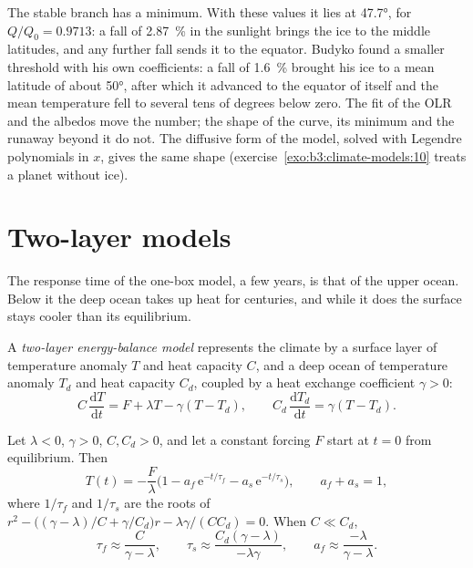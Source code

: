 
The stable branch has a minimum. With these values it lies at \ang{47.7},
for $Q/Q_0 = \num{0.9713}$: a fall of \qty{2.87}{\percent} in the sunlight
brings the ice to the middle latitudes, and any further fall sends it to
the equator. Budyko found a smaller threshold with his own coefficients: a
fall of \qty{1.6}{\percent} brought his ice to a mean latitude of about
\ang{50}, after which it advanced to the equator of itself and the mean
temperature fell to several tens of degrees below zero. The fit of the OLR
and the albedos move the number; the shape of the curve, its minimum and the
runaway beyond it do not. The diffusive form of the model, solved with
Legendre polynomials in $x$, gives the same shape (exercise~\ref{exo:b3:climate-models:10}
treats a planet without ice).

\section{Two-layer models}\label{sec:b3:climate-models:two-layer}

The response time of the one-box model, a few years, is that of the upper
ocean. Below it the deep ocean takes up heat for centuries, and while it
does the surface stays cooler than its equilibrium.

\begin{definition}\label{def:b3:climate-models:two-layer}
A \emph{two-layer energy-balance model}
represents the climate by a surface layer of temperature anomaly $T$
and heat capacity $C$, and a deep ocean of temperature anomaly $T_d$ and
heat capacity $C_d$, coupled by a heat exchange coefficient $\gamma > 0$:
\[
C\,\frac{\mathrm dT}{\mathrm dt} = F + \lambda T - \gamma(T - T_d), \qquad
C_d\,\frac{\mathrm dT_d}{\mathrm dt} = \gamma(T - T_d) .
\]
\end{definition}

\begin{theorem}\label{thm:b3:climate-models:two-layer}
Let $\lambda < 0$, $\gamma > 0$, $C, C_d > 0$, and let a constant forcing
$F$ start at $t = 0$ from equilibrium. Then
\[
T(t) = -\frac{F}{\lambda}\Big(1 - a_f\,\mathrm e^{-t/\tau_f} - a_s\,\mathrm
e^{-t/\tau_s}\Big), \qquad a_f + a_s = 1 ,
\]
where $1/\tau_f$ and $1/\tau_s$ are the roots of $r^2 - \big((\gamma -
\lambda)/C + \gamma/C_d\big)r - \lambda\gamma/(CC_d) = 0$. When $C \ll C_d$,
\[
\tau_f \approx \frac{C}{\gamma - \lambda}, \qquad
\tau_s \approx \frac{C_d(\gamma - \lambda)}{-\lambda\gamma}, \qquad
a_f \approx \frac{-\lambda}{\gamma - \lambda} .
\]
\end{theorem}

